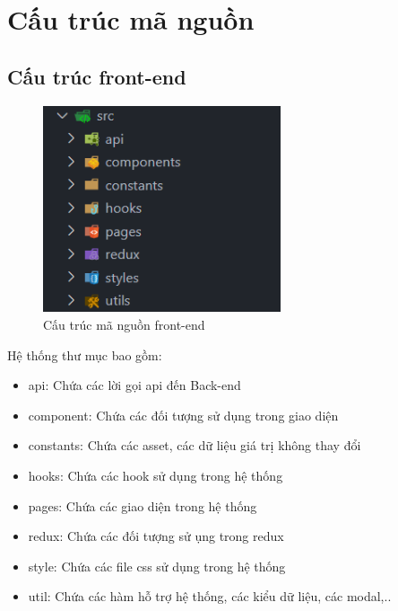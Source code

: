 \section{Cấu trúc mã nguồn}
\subsection{Cấu trúc front-end}
\begin{figure}[!htp]
    \begin{center}
        \includegraphics[width=7cm]{img/file-structure/front-end.png}
    \end{center}
    \caption{Cấu trúc mã nguồn front-end}
\end{figure}

Hệ thống thư mục bao gồm:
\begin{itemize}
    \item api: Chứa các lời gọi api đến Back-end
    \item component: Chứa các đối tượng sử dụng trong giao diện
    \item constants: Chứa các asset, các dữ liệu giá trị không thay đổi
    \item hooks: Chứa các hook sử dụng trong hệ thống
    \item pages: Chứa các giao diện trong hệ thống
    \item redux: Chứa các đối tượng sử ụng trong redux
    \item style: Chứa các file css sử dụng trong hệ thống
    \item util: Chứa các hàm hỗ trợ hệ thống, các kiểu dữ liệu, các modal,..
\end{itemize}


